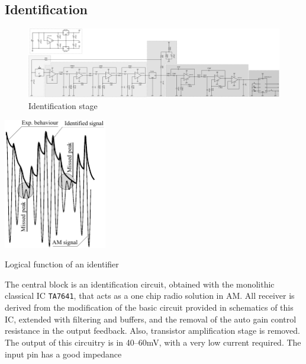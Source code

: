 \subsection{Identification}
\begin{figure}[h]
	\centering
	\includegraphics*[viewport=1251 3 1580 595,scale=0.4]{ch2/img/receiver3.pdf}
	\caption{Identification stage}
	\label{fig:identifier}
\end{figure}
\begin{marginfigure}
	\centering
	\includegraphics[width=4.5cm]{ch2/img/identificatore.pdf}
	\caption{Logical function of an identifier}
	\label{fig:identifier_log}
\end{marginfigure}
The central block is an identification circuit, obtained with the monolithic classical IC \texttt{TA7641},  that acts as a one chip radio solution in AM. All receiver is derived from the modification of the basic circuit provided in schematics of this IC, extended with filtering and buffers, and the removal of the auto gain control resistance in the output feedback. Also, transistor amplification stage is removed. The output of this circuitry is in \numrange{40}{60}\si{\milli\volt}, with a very low current required. The input pin has a good impedance 

